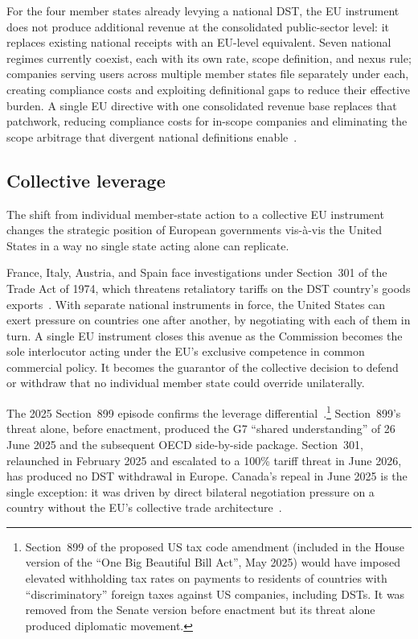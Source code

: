 \documentclass[../../main]{subfiles}
\begin{document}
For the four member states already levying a national DST, the EU instrument does not produce additional revenue at the consolidated public-sector level: it replaces existing national receipts with an EU-level equivalent.
Seven national regimes currently coexist, each with its own rate, scope definition, and nexus rule; companies serving users across multiple member states file separately under each, creating compliance costs and exploiting definitional gaps to reduce their effective burden. %
A single EU directive with one consolidated revenue base replaces that patchwork, reducing compliance costs for in-scope companies and eliminating the scope arbitrage that divergent national definitions enable~\citep{eu_commission_proposal}.


\subsection{Collective leverage}
\label{sec:strategic}

The shift from individual member-state action to a collective EU instrument changes the strategic position of European governments vis-\`{a}-vis the United States in a way no single state acting alone can replicate.

France, Italy, Austria, and Spain face investigations under Section~301 of the Trade Act of 1974, which threatens retaliatory tariffs on the DST country's goods exports~\citep{ustr_section301_dst,skadden_feb2025}.
With separate national instruments in force, the United States can exert pressure on countries one after another, by negotiating with each of them in turn.
A single EU instrument closes this avenue as the Commission becomes the sole interlocutor acting under the EU's exclusive competence in common commercial policy. It becomes the guarantor of the collective decision to defend or withdraw that no individual member state could override unilaterally.

The 2025 Section~899 episode confirms the leverage differential~\citep{crs_if13023}.\footnote{Section~899 of the proposed US tax code amendment (included in the House version of the ``One Big Beautiful Bill Act'', May 2025) would have imposed elevated withholding tax rates on payments to residents of countries with ``discriminatory'' foreign taxes against US companies, including DSTs. It was removed from the Senate version before enactment but its threat alone produced diplomatic movement.}
Section~899's threat alone, before enactment, produced the G7 ``shared understanding'' of 26 June 2025 and the subsequent OECD side-by-side package.
Section~301, relaunched in February 2025 and escalated to a 100\% tariff threat in June 2026, has produced no DST withdrawal in Europe.
Canada's repeal in June 2025 is the single exception: it was driven by direct bilateral negotiation pressure on a country without the EU's collective trade architecture~\citep{canada_finance_rescission_jun2025}.
\end{document}
